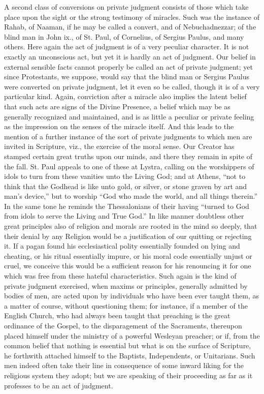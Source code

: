 A second class of conversions on private judgment consists of those
which take place upon the sight or the strong testimony of miracles.
Such was the instance of Rahab, of Naaman, if he may be called a
convert, and of Nebuchadnezzar; of the blind man in John ix., of St.
Paul, of Cornelius, of Sergius Paulus, and many others. Here again the
act of judgment is of a very peculiar character. It is not exactly an
unconscious act, but yet it is hardly an act of judgment. Our belief
in external sensible facts cannot properly be called an act of private
judgment; yet since Protestants, we suppose, would say that the blind
man or Sergius Paulus were converted on private judgment, let it even
so be called, though it is of a very particular kind. Again,
conviction after a miracle also implies the latent belief that such
acts are signs of the Divine Presence, a belief which may be as
generally recognized and maintained, and is as little a peculiar or
private feeling as the impression on the senses of the miracle
itself. And this leads to the mention of a further instance of the
sort of private judgments to which men are invited in Scripture, viz.,
the exercise of the moral sense. Our Creator has stamped certain great
truths upon our minds, and there they remain in spite of the fall. St.
Paul appeals to one of these at Lystra, calling on the worshippers of
idols to turn from these vanities unto the Living God; and at Athens,
``not to think that the Godhead is like unto gold, or silver, or
stone graven by art and man's device,'' but to worship ``God
who made the world, and all things therein.'' In the same tone he
reminds the Thessalonians of their having ``turned to God from
idols to serve the Living and True God.'' In like manner doubtless
other great principles also of religion and morals are rooted in the
mind so deeply, that their denial by any Religion would be a
justification of our quitting or rejecting it. If a pagan found his
ecclesiastical polity essentially founded on lying and cheating, or
his ritual essentially impure, or his moral code essentially unjust or
cruel, we conceive this would be a sufficient reason for his
renouncing it for one which was free from these hateful
characteristics. Such again is the kind of private judgment exercised,
when maxims or principles, generally admitted by bodies of men, are
acted upon by individuals who have been ever taught them, as a matter
of course, without questioning them; for instance, if a member of the
English Church, who had always been taught that preaching is the great
ordinance of the Gospel, to the disparagement of the Sacraments,
thereupon placed himself under the ministry of a powerful Wesleyan
preacher; or if, from the common belief that nothing is essential but
what is on the surface of Scripture, he forthwith attached himself to
the Baptists, Independents, or Unitarians. Such men indeed often
take their line in consequence of some inward liking for the religious
system they adopt; but we are speaking of their proceeding as far as
it professes to be an act of judgment.

